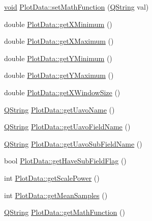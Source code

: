 \begin{DoxyCompactItemize}
\item 
\hyperlink{group___u_a_v_objects_plugin_ga444cf2ff3f0ecbe028adce838d373f5c}{void} \hyperlink{group___scope_plugin_ga8941026dea84deb5daecfa316880c3c7}{\-Plot\-Data\-::set\-Math\-Function} (\hyperlink{group___u_a_v_objects_plugin_gab9d252f49c333c94a72f97ce3105a32d}{\-Q\-String} val)
\item 
double \hyperlink{group___scope_plugin_ga3a62af34baa396699e6736ddcdb64dc3}{\-Plot\-Data\-::get\-X\-Minimum} ()
\item 
double \hyperlink{group___scope_plugin_gaef24895f0dd44554615466c28d374549}{\-Plot\-Data\-::get\-X\-Maximum} ()
\item 
double \hyperlink{group___scope_plugin_ga274c41324919eda32410304280b3e15c}{\-Plot\-Data\-::get\-Y\-Minimum} ()
\item 
double \hyperlink{group___scope_plugin_ga1a2f11fcbe323426d216c9f08cb88bdc}{\-Plot\-Data\-::get\-Y\-Maximum} ()
\item 
double \hyperlink{group___scope_plugin_ga1bd7d819b7cc24c4b73264f145e7dace}{\-Plot\-Data\-::get\-X\-Window\-Size} ()
\item 
\hyperlink{group___u_a_v_objects_plugin_gab9d252f49c333c94a72f97ce3105a32d}{\-Q\-String} \hyperlink{group___scope_plugin_gae2c24d702ce50840beff3b3907508069}{\-Plot\-Data\-::get\-Uavo\-Name} ()
\item 
\hyperlink{group___u_a_v_objects_plugin_gab9d252f49c333c94a72f97ce3105a32d}{\-Q\-String} \hyperlink{group___scope_plugin_ga0ed12e4fd388a14e187425d0619f6a94}{\-Plot\-Data\-::get\-Uavo\-Field\-Name} ()
\item 
\hyperlink{group___u_a_v_objects_plugin_gab9d252f49c333c94a72f97ce3105a32d}{\-Q\-String} \hyperlink{group___scope_plugin_ga0aeeb65196f7617cd931af568a04d174}{\-Plot\-Data\-::get\-Uavo\-Sub\-Field\-Name} ()
\item 
bool \hyperlink{group___scope_plugin_gaac624ceed7580c679cbbb43c46881718}{\-Plot\-Data\-::get\-Have\-Sub\-Field\-Flag} ()
\item 
int \hyperlink{group___scope_plugin_ga598d81218b7c2912d88b61e5b1e9d342}{\-Plot\-Data\-::get\-Scale\-Power} ()
\item 
int \hyperlink{group___scope_plugin_ga21623188dbae082bf46f247209363664}{\-Plot\-Data\-::get\-Mean\-Samples} ()
\item 
\hyperlink{group___u_a_v_objects_plugin_gab9d252f49c333c94a72f97ce3105a32d}{\-Q\-String} \hyperlink{group___scope_plugin_ga22e23fa455628102d53af51bb4ff4a62}{\-Plot\-Data\-::get\-Math\-Function} ()
\item 

\end{DoxyCompactItemize}
